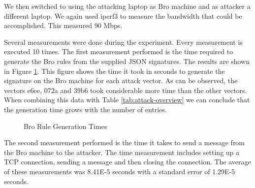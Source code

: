 We then switched to using the attacking laptop as Bro machine and as attacker a different laptop. We again used iperf3 to measure the bandwidth that could be accomplished. This measured 90 Mbps.  

Several measurements were done during the experiment. Every measurement is executed 10 times. The first measurement performed is the time required to generate the Bro rules from the supplied JSON signatures. The results are shown in Figure \ref{fig:generation-times}. This figure shows the time it took in seconds to generate the signature on the Bro machine for each attack vector. As can be observed, the vectors e6ee, 072a and 39b6 took considerable more time than the other vectors. When combining this data with Table \ref{tab:attack-overview} we can conclude that the generation time grows with the number of entries.


\begin{figure}[H]
\centering
{}
\caption{Bro Rule Generation Times}
\label{fig:generation-times}
\end{figure}

The second measurement performed is the time it takes to send a message from the Bro machine to the attacker. The time measurement includes setting up a TCP connection, sending a message and then closing the connection. The average of these measurements was 8.41E-5 seconds with a standard error of 1.29E-5 seconds. 

